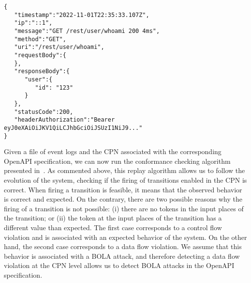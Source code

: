 \begin{lstlisting}[caption={JSON event log example.},captionpos=t, label={lst:example_JSON}, basicstyle=\ttfamily\scriptsize,frame=single,breaklines=true]
{
   "timestamp":"2022-11-01T22:35:33.107Z",
   "ip":"::1",
   "message":"GET /rest/user/whoami 200 4ms",
   "method":"GET",
   "uri":"/rest/user/whoami",
   "requestBody":{
   },
   "responseBody":{
      "user":{
         "id": "123"
      }
   },
   "statusCode":200,
   "headerAuthorization":"Bearer eyJ0eXAiOiJKV1QiLCJhbGciOiJSUzI1NiJ9..."
}
\end{lstlisting}

Given a file of event logs and the CPN associated with the corresponding OpenAPI specification, we can now run the conformance checking algorithm presented in~\cite{carrasquel2020checking}. As commented above, this replay algorithm allows us to follow the evolution of the system, checking if the firing of transitions enabled in the CPN is correct. When firing a transition is feasible, it means that the observed behavior is correct and  expected. On the contrary, there are two possible reasons why the firing of a transition is not possible: (i) there are no tokens in the input places of the transition; or (ii) the token at the input places of the transition has a different value than expected. The first case corresponds to a control flow violation and is associated with an expected behavior of the system. On the other hand, the second case corresponds to a data flow violation. We assume that this behavior is associated with a BOLA attack, and therefore detecting a data flow violation at the CPN level allows us to detect BOLA attacks in the OpenAPI specification.